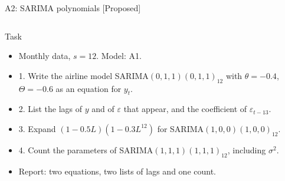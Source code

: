 \begin{frame}{A2: SARIMA polynomials [Proposed]}
\propsub
\itemsize{\scriptsize}
\begin{columns}[T]
\begin{column}{\taskw}
\begin{block}{Task}
\begin{itemize}
    \item Monthly data, $s = 12$. Model: A1.
    \item 1. Write the airline model SARIMA$(0,1,1)(0,1,1)_{12}$ with $\theta = -0.4$, $\Theta = -0.6$ as an equation for $y_t$.
    \item 2. List the lags of $y$ and of $\varepsilon$ that appear, and the coefficient of $\varepsilon_{t-13}$.
    \item 3. Expand $(1 - 0.5L)(1 - 0.3L^{12})$ for SARIMA$(1,0,0)(1,0,0)_{12}$.
    \item 4. Count the parameters of SARIMA$(1,1,1)(1,1,1)_{12}$, including $\sigma^2$.
    \item Report: two equations, two lists of lags and one count.
\end{itemize}
\end{block}
\end{column}
\begin{column}{\solw}
\end{column}
\end{columns}
\end{frame}

